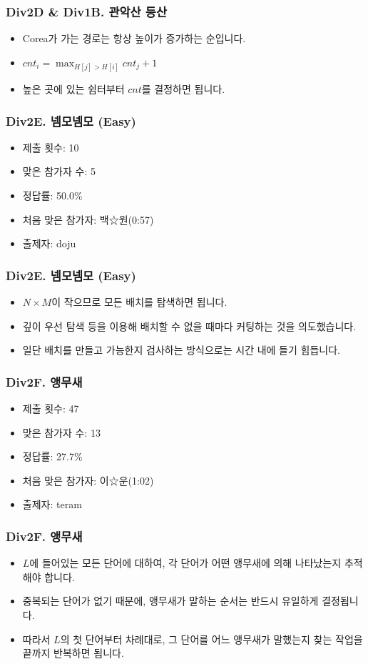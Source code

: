 \documentclass[xetex]{beamer}
\begin{document}
\begin{frame}
  \frametitle{Div2D \& Div1B. 관악산 등산}
  \begin{itemize}
    \item Corea가 가는 경로는 항상 높이가 증가하는 순입니다.
    \item $cnt_{i} = \max_{H[j] > H[i]} cnt_{j} + 1$
    \item 높은 곳에 있는 쉼터부터 $cnt$를 결정하면 됩니다.
  \end{itemize}
\end{frame}

\begin{frame}
  \frametitle{Div2E. 넴모넴모 (Easy)}
  \begin{itemize}
    \item 제출 횟수: 10
    \item 맞은 참가자 수: 5
    \item 정답률: 50.0\%
    \item 처음 맞은 참가자: 백☆원(0:57)
    \item 출제자: doju
  \end{itemize}
\end{frame}

\begin{frame}
  \frametitle{Div2E. 넴모넴모 (Easy)}
  \begin{itemize}
    \item $N \times M$이 작으므로 모든 배치를 탐색하면 됩니다.
    \item 깊이 우선 탐색 등을 이용해 배치할 수 없을 때마다 커팅하는 것을 의도했습니다.
    \item 일단 배치를 만들고 가능한지 검사하는 방식으로는 시간 내에 들기 힘듭니다.
  \end{itemize}
\end{frame}

\begin{frame}
  \frametitle{Div2F. 앵무새}
  \begin{itemize}
    \item 제출 횟수: 47
    \item 맞은 참가자 수: 13
    \item 정답률: 27.7\%
    \item 처음 맞은 참가자: 이☆운(1:02)
    \item 출제자: teram
  \end{itemize}
\end{frame}

\begin{frame}
  \frametitle{Div2F. 앵무새}
  \begin{itemize}
    \item $L$에 들어있는 모든 단어에 대하여, 각 단어가 어떤 앵무새에 의해 나타났는지 추적해야 합니다.
    \item 중복되는 단어가 없기 때문에, 앵무새가 말하는 순서는 반드시 유일하게 결정됩니다.
    \item 따라서 $L$의 첫 단어부터 차례대로, 그 단어를 어느 앵무새가 말했는지 찾는 작업을 끝까지 반복하면 됩니다.
  \end{itemize}
\end{frame}
\end{document}
